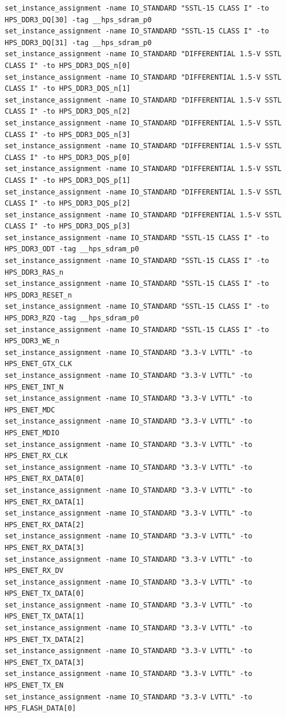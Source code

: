 \documentclass[conference]{IEEEtran}
\begin{document}
\begin{lstlisting}
set_instance_assignment -name IO_STANDARD "SSTL-15 CLASS I" -to HPS_DDR3_DQ[30] -tag __hps_sdram_p0
set_instance_assignment -name IO_STANDARD "SSTL-15 CLASS I" -to HPS_DDR3_DQ[31] -tag __hps_sdram_p0
set_instance_assignment -name IO_STANDARD "DIFFERENTIAL 1.5-V SSTL CLASS I" -to HPS_DDR3_DQS_n[0]
set_instance_assignment -name IO_STANDARD "DIFFERENTIAL 1.5-V SSTL CLASS I" -to HPS_DDR3_DQS_n[1]
set_instance_assignment -name IO_STANDARD "DIFFERENTIAL 1.5-V SSTL CLASS I" -to HPS_DDR3_DQS_n[2]
set_instance_assignment -name IO_STANDARD "DIFFERENTIAL 1.5-V SSTL CLASS I" -to HPS_DDR3_DQS_n[3]
set_instance_assignment -name IO_STANDARD "DIFFERENTIAL 1.5-V SSTL CLASS I" -to HPS_DDR3_DQS_p[0]
set_instance_assignment -name IO_STANDARD "DIFFERENTIAL 1.5-V SSTL CLASS I" -to HPS_DDR3_DQS_p[1]
set_instance_assignment -name IO_STANDARD "DIFFERENTIAL 1.5-V SSTL CLASS I" -to HPS_DDR3_DQS_p[2]
set_instance_assignment -name IO_STANDARD "DIFFERENTIAL 1.5-V SSTL CLASS I" -to HPS_DDR3_DQS_p[3]
set_instance_assignment -name IO_STANDARD "SSTL-15 CLASS I" -to HPS_DDR3_ODT -tag __hps_sdram_p0
set_instance_assignment -name IO_STANDARD "SSTL-15 CLASS I" -to HPS_DDR3_RAS_n
set_instance_assignment -name IO_STANDARD "SSTL-15 CLASS I" -to HPS_DDR3_RESET_n
set_instance_assignment -name IO_STANDARD "SSTL-15 CLASS I" -to HPS_DDR3_RZQ -tag __hps_sdram_p0
set_instance_assignment -name IO_STANDARD "SSTL-15 CLASS I" -to HPS_DDR3_WE_n
set_instance_assignment -name IO_STANDARD "3.3-V LVTTL" -to HPS_ENET_GTX_CLK
set_instance_assignment -name IO_STANDARD "3.3-V LVTTL" -to HPS_ENET_INT_N
set_instance_assignment -name IO_STANDARD "3.3-V LVTTL" -to HPS_ENET_MDC
set_instance_assignment -name IO_STANDARD "3.3-V LVTTL" -to HPS_ENET_MDIO
set_instance_assignment -name IO_STANDARD "3.3-V LVTTL" -to HPS_ENET_RX_CLK
set_instance_assignment -name IO_STANDARD "3.3-V LVTTL" -to HPS_ENET_RX_DATA[0]
set_instance_assignment -name IO_STANDARD "3.3-V LVTTL" -to HPS_ENET_RX_DATA[1]
set_instance_assignment -name IO_STANDARD "3.3-V LVTTL" -to HPS_ENET_RX_DATA[2]
set_instance_assignment -name IO_STANDARD "3.3-V LVTTL" -to HPS_ENET_RX_DATA[3]
set_instance_assignment -name IO_STANDARD "3.3-V LVTTL" -to HPS_ENET_RX_DV
set_instance_assignment -name IO_STANDARD "3.3-V LVTTL" -to HPS_ENET_TX_DATA[0]
set_instance_assignment -name IO_STANDARD "3.3-V LVTTL" -to HPS_ENET_TX_DATA[1]
set_instance_assignment -name IO_STANDARD "3.3-V LVTTL" -to HPS_ENET_TX_DATA[2]
set_instance_assignment -name IO_STANDARD "3.3-V LVTTL" -to HPS_ENET_TX_DATA[3]
set_instance_assignment -name IO_STANDARD "3.3-V LVTTL" -to HPS_ENET_TX_EN
set_instance_assignment -name IO_STANDARD "3.3-V LVTTL" -to HPS_FLASH_DATA[0]

\end{lstlisting}
\end{document}
